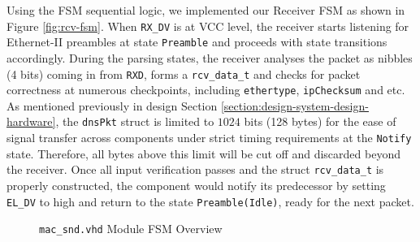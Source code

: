 \documentclass[a4paper]{report}
\newcommand{\code}{\texttt}
\begin{document}
Using the FSM sequential logic, we implemented our Receiver FSM as shown in Figure \ref{fig:rcv-fsm}. When \code{RX\_DV} is at VCC level, the receiver starts listening for Ethernet-II preambles at state \code{Preamble} and proceeds with state transitions accordingly. During the parsing states, the receiver analyses the packet as nibbles (4 bits) coming in from \code{RXD}, forms a \code{rcv\_data\_t} and checks for packet correctness at numerous checkpoints, including \code{ethertype}, \code{ipChecksum} and etc. As mentioned previously in design Section \ref{section:design-system-design-hardware}, the \code{dnsPkt} struct is limited to $1024$ bits (128 bytes) for the ease of signal transfer across components under strict timing requirements at the \code{Notify} state. Therefore, all bytes above this limit will be cut off and discarded beyond the receiver. Once all input verification passes and the struct \code{rcv\_data\_t} is properly constructed, the component would notify its predecessor by setting \code{EL\_DV} to high and return to the state \code{Preamble(Idle)}, ready for the next packet.

\begin{figure}[h!]
  \caption{\code{mac\_snd.vhd} Module FSM Overview}
  \label{fig:snd-fsm}
\end{figure}
\end{document}
